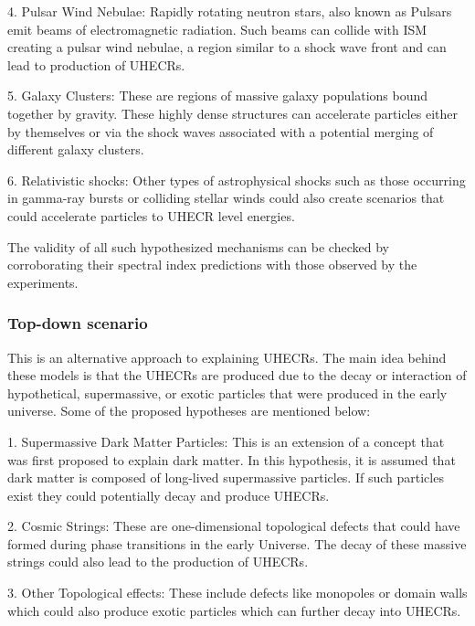 4. Pulsar Wind Nebulae: Rapidly rotating neutron stars, also known as Pulsars emit beams of electromagnetic radiation. Such beams can collide with ISM creating a pulsar wind nebulae, a region similar to a shock wave front and can lead to production of \glspl{UHECR}.~\cite{Cerutti_2020}

5. Galaxy Clusters: These are regions of massive galaxy populations bound together by gravity. These highly dense structures can accelerate particles either by themselves or via the shock waves associated with a potential merging of different galaxy clusters.~\cite{Murase_2008,Condorelli_2023} 

6. Relativistic shocks: Other types of astrophysical shocks such as those occurring in gamma-ray bursts or colliding stellar winds could also create scenarios that could accelerate particles to \gls{UHECR} level energies.~\cite{Kirk_2000,10.1046/j.1365-8711.2001.04851.x}

The validity of all such hypothesized mechanisms can be checked by corroborating their spectral index predictions with those observed by the experiments. 

\subsubsection{Top-down scenario}
\label{subsec:Tdownsce}
This is an alternative approach to explaining \glspl{UHECR}. The main idea behind these models is that the \glspl{UHECR} are produced due to the decay or interaction of hypothetical, supermassive, or exotic particles that were produced in the early universe. Some of the proposed hypotheses are mentioned below:

1. Supermassive Dark Matter Particles: This is an extension of a concept that was first proposed to explain dark matter. In this hypothesis, it is assumed that dark matter is composed of long-lived supermassive particles. If such particles exist they could potentially decay and produce \glspl{UHECR}.~\cite{ALOISIO2008307,MARZOLA201756}

2. Cosmic Strings: These are one-dimensional topological defects that could have formed during phase transitions in the early Universe. The decay of these massive strings could also lead to the production of \glspl{UHECR}.~\cite{BHATTACHARJEE2000109,PhysRevD.64.043004}

3. Other Topological effects: These include defects like monopoles or domain walls which could also produce exotic particles which can further decay into \glspl{UHECR}.~\cite{PhysRevLett.79.5202} 

